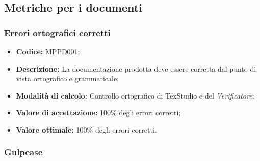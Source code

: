 \documentclass[../NormediProgetto.tex]{subfiles}
\begin{document}

\subsection{Metriche per i documenti}

\subsubsection{Errori ortografici corretti}

\begin{itemize}
	\item \textbf{Codice:} MPPD001;
	\item \textbf{Descrizione:} La documentazione prodotta deve essere corretta dal punto di vista ortografico e grammaticale;
	\item \textbf{Modalità di calcolo:} Controllo ortografico di TexStudio e del \textit{Verificatore};
	\item \textbf{Valore di accettazione:} 100\% degli errori corretti;
	\item \textbf{Valore ottimale:} 100\% degli errori corretti.
\end{itemize}

\subsubsection{Gulpease}
\end{document}
